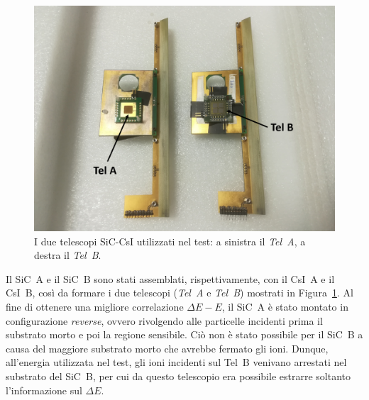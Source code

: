 \begin{figure} [!t]
	\centering
	\includegraphics[width=\textwidth, keepaspectratio]{Grafici/telescopi_etichette.png}
	\caption{I due telescopi SiC-CsI utilizzati nel test: a sinistra il \emph{Tel~A}, a destra il \emph{Tel~B}.} \label{fig:telescopi}
\end{figure}






Il SiC~A e il SiC~B sono stati assemblati, rispettivamente, con il CsI~A e il CsI~B, così da formare i due telescopi (\emph{Tel~A} e \emph{Tel~B}) mostrati in Figura~\ref{fig:telescopi}.
Al fine di ottenere una migliore correlazione $\Delta E - E$, il SiC~A è stato montato in configurazione \emph{reverse}, ovvero rivolgendo alle particelle incidenti prima il substrato morto e poi la regione sensibile.
Ciò non è stato possibile per il SiC~B a causa del maggiore substrato morto che avrebbe fermato gli ioni.
Dunque, all'energia utilizzata nel test, gli ioni incidenti sul Tel~B venivano arrestati nel substrato del SiC~B, per cui da questo telescopio era possibile estrarre soltanto l'informazione sul $\Delta E$.

